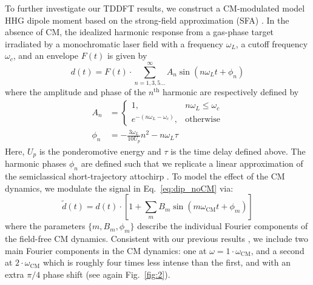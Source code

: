 \documentclass[journal=jacsat,manuscript=article]{achemso}
\begin{document}
To further investigate our TDDFT results, we construct a CM-modulated model HHG dipole moment based on the strong-field approximation (SFA) \cite{lewenstein1994}. In the absence of CM, the idealized harmonic response from a gas-phase target irradiated by a monochromatic laser field with a frequency $\omega_{L}$, a cutoff frequency $\omega_{c}$, and an envelope $F(t)$ is given by
\begin{equation}\label{eq:dip_noCM}
    d(t) = F(t) \cdot \sum_{n=1,3,5\ldots}^{\infty} A_{n} \sin{\left(n\omega_{L}t + \phi_{n}\right)}
\end{equation}
where the amplitude and phase of the $n^{\text{th}}$ harmonic are respectively defined by
\begin{align}
    A_{n} &= \begin{cases} 1, & n \omega_{L} \leq \omega_{c} \\ e^{-(n\omega_{L} - \omega_{c})}, & \text{otherwise} \end{cases} \label{eq:model_amp}\\
    \phi_{n} &= -\frac{3 \omega_{L}}{10 U_{p}}n^{2} - n \omega_{L} \tau \label{eq:model_phase}
\end{align}
Here, $U_{p}$ is the ponderomotive energy and $\tau$ is the time delay defined above. The harmonic phases $\phi_{n}$ are defined such that we replicate a linear approximation of the semiclassical short-trajectory attochirp \cite{chang2011}. To model the effect of the CM dynamics, we modulate the signal in Eq.~{\ref{eq:dip_noCM}} via:
\begin{equation}\label{eq:dip_CM}
    \tilde{d}(t) = d(t) \cdot \left[1 + \sum_{m} B_{m} \sin{(m \omega_{\text{CM}} t + \phi_{m})}\right]
\end{equation}
where the parameters $\{m, B_{m}, \phi_{m}\}$ describe the individual Fourier components of the field-free CM dynamics.  Consistent with our previous results \cite{hamer2022}, we include two main Fourier components in the CM dynamics: one at $\omega = 1 \cdot \omega_{\text{CM}}$, and a second at $2 \cdot \omega_{\text{CM}}$ which is roughly four times less intense than the first, and with an extra $\pi/4$ phase shift (see again Fig.~{\ref{fig:2}}). 
\end{document}
